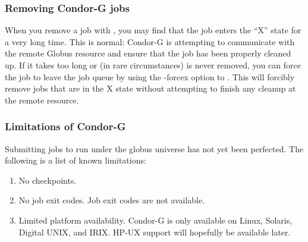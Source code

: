 




\subsubsection{Removing Condor-G jobs}

When you remove a job with , you may find that the job
enters the ``X'' state for a very long time. This is normal: Condor-G
is attempting to communicate with the remote Globus resource and
ensure that the job has been properly cleaned up. If it takes too long
or (in rare circumstances) is never removed, you can force the job to
leave the job queue by using the -forcex option to . This
will forcibly remove jobs that are in the X state without attempting
to finish any cleanup at the remote resource.

\subsubsection{\label{sec:Condor-G-Limits}Limitations of Condor-G}
Submitting jobs to run under the globus universe has not yet
been perfected.
The following is a list of known limitations:

\begin{enumerate}
\item{No checkpoints.}
\item{No job exit codes.}
Job exit codes are not available.
\item{Limited platform availability.}
Condor-G is only available on Linux, Solaris,
Digital UNIX, and IRIX.
HP-UX support will hopefully be available later.
\end{enumerate}
